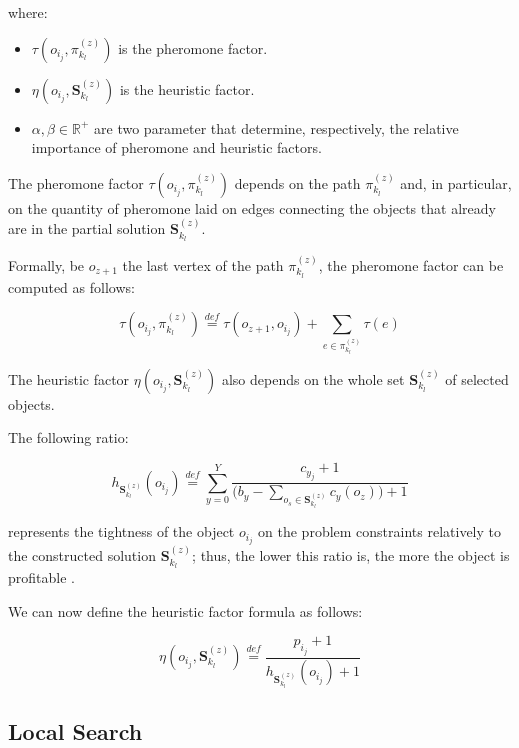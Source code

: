 \documentclass[12pt,a4paper]{report}
\newcommand{\mathDef}{\overset{\textit{def}}{=}}
\newcommand{\Rplus}{\mathbb{R}^+}
\begin{document}
where:

\begin{itemize}
	\item $\tau( o_{i_j}, \pi_{k_l}^{(z)})$ is the pheromone factor.
	\item $\eta( o_{i_j}, \textbf{S}_{k_l}^{(z)})$ is the heuristic factor.
	\item $\alpha, \beta \in \Rplus$ are two parameter that determine, respectively, the relative importance of pheromone and heuristic factors.
\end{itemize}

The pheromone factor $\tau( o_{i_j}, \pi_{k_l}^{(z)})$ depends on the path $\pi_{k_l}^{(z)}$ and, in particular, on the quantity of pheromone laid on edges connecting the objects that already are in the partial solution $\textbf{S}_{k_l}^{(z)}$.

Formally, be $o_{z+1}$ the last vertex of the path $\pi_{k_l}^{(z)}$, the pheromone factor can be computed as follows:

\begin{equation}
	\tau( o_{i_j}, \pi_{k_l}^{(z)}) \mathDef \tau(o_{z+1}, o_{i_j}) + \sum_{e \in \pi_{k_l}^{(z)}} \tau(e) 
\end{equation}

The heuristic factor $\eta( o_{i_j}, \textbf{S}_{k_l}^{(z)})$ also depends on the whole set $\textbf{S}_{k_l}^{(z)}$ of selected objects. 



The following ratio:

\begin{equation}
	h_{\textbf{S}_{k_l}^{(z)}}(o_{i_j}) \mathDef \displaystyle \sum_{y=0}^{Y} \frac{c_{y_j} + 1}{\displaystyle  \Big( b_y - \sum_{o_s \in \textbf{S}_{k_l}^{(z)}} c_y(o_z)\Big) + 1}
\end{equation}

represents the tightness of the object $o_{i_j}$ on the problem constraints relatively to the constructed solution $\textbf{S}_{k_l}^{(z)}$; thus, the lower this ratio is, the more the object is profitable \cite{acosemplice}.

We can now define the heuristic factor formula as follows:

\begin{equation}
	\eta( o_{i_j}, \textbf{S}_{k_l}^{(z)}) \mathDef \frac{p_{i_j} + 1}{h_{\textbf{S}_{k_l}^{(z)}}(o_{i_j}) + 1}
\end{equation}

\subsection{Local Search}
\end{document}
